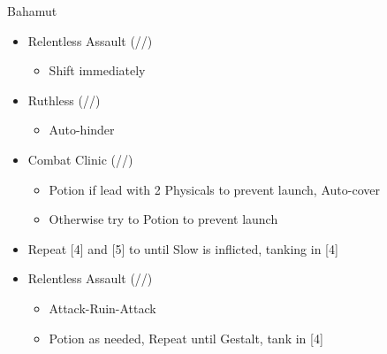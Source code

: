 \renewcommand{\first}{[1] Relentless Assault (\com/\rav/\rav)}
\renewcommand{\fifth}{[5] Ruthless (\sab/\com/\rav)
\renewcommand{\fourth}{[4] Combat Clinic (\sen/\med/\med)}}
\begin{battle}{Bahamut}
\begin{itemize}
    \item \first
    \begin{itemize}
        \item Shift immediately
    \end{itemize}
    \item \fifth
    \begin{itemize}
        \item Auto-hinder
    \end{itemize}
    \item \fourth
    \begin{itemize}
        \item Potion if lead with 2 Physicals to prevent launch, Auto-cover
        \item Otherwise try to Potion to prevent launch
    \end{itemize}
    \item Repeat [4] and [5] to until Slow is inflicted, tanking in [4]
    \item \first
    \begin{itemize}
        \item Attack-Ruin-Attack
        \item Potion as needed, Repeat until Gestalt, tank in [4]
    \end{itemize}
\end{itemize}
\end{battle}
